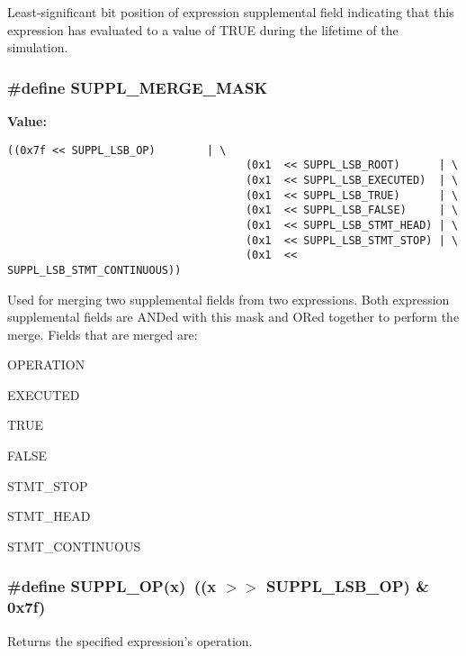 Least-significant bit position of expression supplemental field indicating that this expression has evaluated to a value of TRUE during the lifetime of the simulation. 
\subsubsection{\setlength{\rightskip}{0pt plus 5cm}\#define SUPPL\_\-MERGE\_\-MASK}\label{group__expr__suppl_a11}


{\bf Value:}

\footnotesize\begin{verbatim}((0x7f << SUPPL_LSB_OP)        | \
                                     (0x1  << SUPPL_LSB_ROOT)      | \
                                     (0x1  << SUPPL_LSB_EXECUTED)  | \
                                     (0x1  << SUPPL_LSB_TRUE)      | \
                                     (0x1  << SUPPL_LSB_FALSE)     | \
                                     (0x1  << SUPPL_LSB_STMT_HEAD) | \
                                     (0x1  << SUPPL_LSB_STMT_STOP) | \
                                     (0x1  << SUPPL_LSB_STMT_CONTINUOUS))\end{verbatim}\normalsize 
Used for merging two supplemental fields from two expressions. Both expression supplemental fields are ANDed with this mask and ORed together to perform the merge. Fields that are merged are:\begin{CompactItemize}
\item 
OPERATION\item 
EXECUTED\item 
TRUE\item 
FALSE\item 
STMT\_\-STOP\item 
STMT\_\-HEAD\item 
STMT\_\-CONTINUOUS \end{CompactItemize}
\subsubsection{\setlength{\rightskip}{0pt plus 5cm}\#define SUPPL\_\-OP(x)\ ((x $>$$>$ SUPPL\_\-LSB\_\-OP) \& 0x7f)}\label{group__expr__suppl_a21}


Returns the specified expression's operation. 
